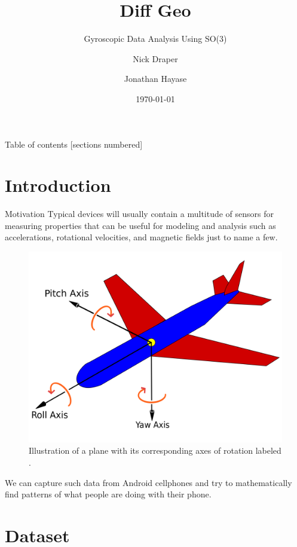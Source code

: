 \documentclass[10pt]{beamer}
\title{Diff Geo}
\subtitle{Gyroscopic Data Analysis Using SO(3)}
\date{\today}
\author{Nick Draper \and Jonathan Hayase}
\institute{Math 143 -- Differential Geometry Seminar -- Spring 2018}
\begin{document}
\maketitle

\begin{frame}{Table of contents}
    [sections numbered]
    \tableofcontents[hideallsubsections]
\end{frame}

\section{Introduction}

\begin{frame} {Motivation}
Typical devices will usually contain a multitude of sensors for measuring properties that can be useful for modeling and analysis such as accelerations, rotational velocities, and magnetic fields just to name a few. 
\begin{figure}
\includegraphics[scale=0.08]{images/plane.png}
\caption{Illustration of a plane with its corresponding axes of rotation labeled \cite{plane1}.}
\end{figure}
\end{frame}

\begin{frame}
We can capture such data from Android  cellphones and try to mathematically find patterns of what people are doing with their phone. 
\end{frame}

\section{Dataset}
\end{document}
